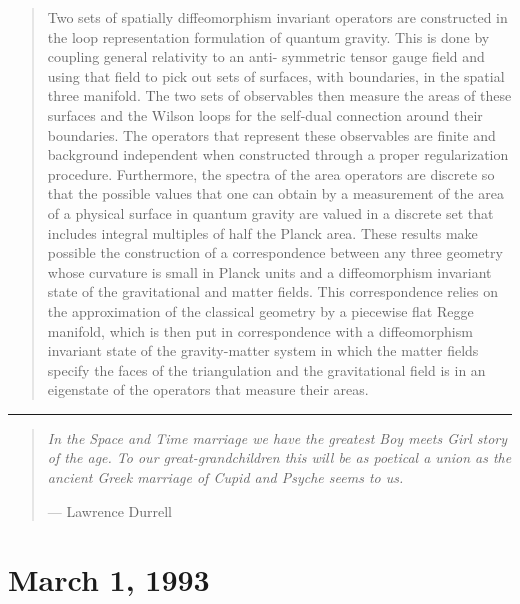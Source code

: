 \documentclass{article}
\def\tightlist{}
\renewcommand{\texttt}[1]{%
  \begingroup
  \ttfamily
  \begingroup\lccode`~=`/\lowercase{\endgroup\def~}{/\discretionary{}{}{}}%
  \begingroup\lccode`~=`[\lowercase{\endgroup\def~}{[\discretionary{}{}{}}%
  \begingroup\lccode`~=`.\lowercase{\endgroup\def~}{.\discretionary{}{}{}}%
  \catcode`/=\active\catcode`[=\active\catcode`.=\active
  \scantokens{#1\noexpand}%
  \endgroup
}
\begin{document}
\begin{quote}
Two sets of spatially diffeomorphism invariant operators are constructed
in the loop representation formulation of quantum gravity. This is done
by coupling general relativity to an anti- symmetric tensor gauge field
and using that field to pick out sets of surfaces, with boundaries, in
the spatial three manifold. The two sets of observables then measure the
areas of these surfaces and the Wilson loops for the self-dual
connection around their boundaries. The operators that represent these
observables are finite and background independent when constructed
through a proper regularization procedure. Furthermore, the spectra of
the area operators are discrete so that the possible values that one can
obtain by a measurement of the area of a physical surface in quantum
gravity are valued in a discrete set that includes integral multiples of
half the Planck area. These results make possible the construction of a
correspondence between any three geometry whose curvature is small in
Planck units and a diffeomorphism invariant state of the gravitational
and matter fields. This correspondence relies on the approximation of
the classical geometry by a piecewise flat Regge manifold, which is then
put in correspondence with a diffeomorphism invariant state of the
gravity-matter system in which the matter fields specify the faces of
the triangulation and the gravitational field is in an eigenstate of the
operators that measure their areas.
\end{quote}

\begin{center}\rule{0.5\linewidth}{0.5pt}\end{center}

\begin{quote}
\emph{In the Space and Time marriage we have the greatest Boy meets Girl
story of the age. To our great-grandchildren this will be as poetical a
union as the ancient Greek marriage of Cupid and Psyche seems to us.}

--- Lawrence Durrell
\end{quote}



\hypertarget{week7}{%
\section{March 1, 1993}\label{week7}}

\end{document}
